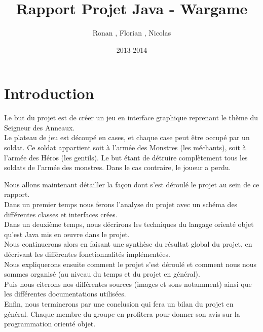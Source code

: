 \documentclass{article}
\title{Rapport Projet Java - Wargame}
\author{Ronan \bsc{Abhamon}, Florian \bsc{Bigard}, Nicolas \bsc{Reynaud}}
\date{2013-2014}
\begin{document}
\maketitle
\newpage

\renewcommand{\contentsname}{Sommaire}
\tableofcontents
\newpage


\section{Introduction}
Le but du projet est de créer un jeu en interface graphique reprenant le thème du Seigneur des Anneaux. \\
Le plateau de jeu est découpé en cases, et chaque case peut être occupé par un soldat.
Ce soldat appartient soit à l'armée des Monstres (les méchants), soit à l'armée des Héros (les gentils).
Le but étant de détruire complètement tous les soldats de l'armée des monstres. Dans le cas contraire, le joueur a perdu.

Nous allons maintenant détailler la façon dont s'est déroulé le projet au sein de ce rapport. \\
Dans un premier temps nous ferons l'analyse du projet avec un schéma des différentes classes et interfaces crées. \\
Dans un deuxième temps, nous décrirons les techniques du langage orienté objet qu'est Java mis en œuvre dans le projet. \\
Nous continuerons alors en faisant une synthèse du résultat global du projet, en décrivant les différentes fonctionnalités implémentées. \\
Nous expliquerons ensuite comment le projet s'est déroulé et comment nous nous sommes organisé (au niveau du temps et du projet en général). \\
Puis nous citerons nos différentes sources (images et sons notamment) ainsi que les différentes documentations utilisées. \\
Enfin, nous terminerons par une conclusion qui fera un bilan du projet en général.
Chaque membre du groupe en profitera pour donner son avis sur la programmation orienté objet. \\
\end{document}
